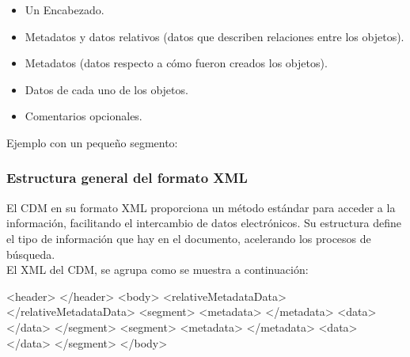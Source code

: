 \begin{itemize}
\itemsep0em
\item Un Encabezado.
\item Metadatos y datos relativos (datos que describen relaciones entre los objetos).
\item Metadatos (datos respecto a c\'omo fueron creados los objetos).
\item Datos de cada uno de los objetos.
\item Comentarios opcionales.
\end{itemize}

Ejemplo con un peque\~no segmento:\\



\subsubsection*{Estructura general del formato XML}
El CDM en su formato \ac{XML} proporciona un m\'etodo est\'andar para acceder a la informaci\'on, facilitando el intercambio de datos electr\'onicos. Su estructura define el tipo de informaci\'on que hay en el documento, acelerando los procesos de b\'usqueda.\\
El XML del CDM, se agrupa como se muestra a continuaci\'on:

\begin{verbbox}
<header>
</header>
<body>
  <relativeMetadataData>
  </relativeMetadataData>
  <segment>
    <metadata>
    </metadata>
    <data>
    </data>
  </segment>
  <segment>
    <metadata>
    </metadata>
    <data>
    </data>
  </segment>
</body>\\
\end{verbbox}

